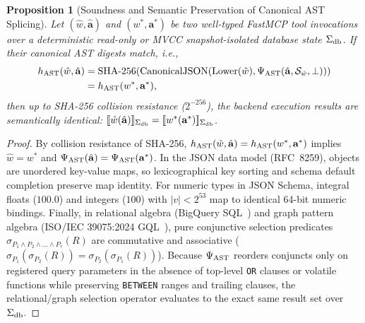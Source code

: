 \documentclass[10pt,conference]{IEEEtran}
\newtheorem{proposition}{Proposition}
\begin{document}
\begin{proposition}[Soundness and Semantic Preservation of Canonical AST Splicing]
\label{prop:ast_soundness}
Let $(\hat{w}, \hat{\mathbf{a}})$ and $(w^*, \mathbf{a}^*)$ be two well-typed FastMCP tool invocations over a deterministic read-only or MVCC snapshot-isolated database state $\Sigma_{\textnormal{db}}$. If their canonical AST digests match, i.e.,
\begin{equation}
\begin{aligned}
h_{\textnormal{AST}}(\hat{w}, \hat{\mathbf{a}}) &= \operatorname{SHA-256}\!\left(\operatorname{CanonicalJSON}\!\left(\operatorname{Lower}(\hat{w}), \Psi_{\textnormal{AST}}(\hat{\mathbf{a}}, \mathcal{S}_{\hat{w}}, \bot)\right)\right) \\
&= h_{\textnormal{AST}}(w^*, \mathbf{a}^*),
\end{aligned}
\end{equation}
then up to SHA-256 collision resistance ($2^{-256}$), the backend execution results are semantically identical: $[\![ \hat{w}(\hat{\mathbf{a}}) ]\!]_{\Sigma_{\textnormal{db}}} = [\![ w^*(\mathbf{a}^*) ]\!]_{\Sigma_{\textnormal{db}}}$.
\end{proposition}

\begin{proof}
By collision resistance of SHA-256, $h_{\textnormal{AST}}(\hat{w}, \hat{\mathbf{a}}) = h_{\textnormal{AST}}(w^*, \mathbf{a}^*)$ implies $\hat{w} = w^*$ and $\Psi_{\textnormal{AST}}(\hat{\mathbf{a}}) = \Psi_{\textnormal{AST}}(\mathbf{a}^*)$. In the JSON data model (RFC~8259), objects are unordered key-value maps, so lexicographical key sorting and schema default completion preserve map identity. For numeric types in JSON Schema, integral floats ($100.0$) and integers ($100$) with $|v| < 2^{53}$ map to identical 64-bit numeric bindings. Finally, in relational algebra (BigQuery SQL~\cite{melnik2010dremel}) and graph pattern algebra (ISO/IEC 39075:2024 GQL~\cite{iso2024gql}), pure conjunctive selection predicates $\sigma_{P_1 \wedge P_2 \wedge \dots \wedge P_r}(R)$ are commutative and associative ($\sigma_{P_1}(\sigma_{P_2}(R)) = \sigma_{P_2}(\sigma_{P_1}(R))$). Because $\Psi_{\textnormal{AST}}$ reorders conjuncts only on registered query parameters in the absence of top-level \texttt{OR} clauses or volatile functions while preserving \texttt{BETWEEN} ranges and trailing clauses, the relational/graph selection operator evaluates to the exact same result set over $\Sigma_{\textnormal{db}}$.
\end{proof}
\end{document}
